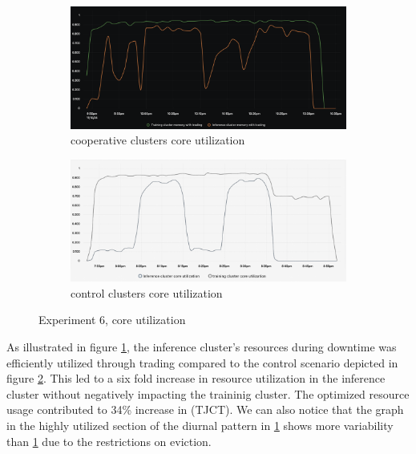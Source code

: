 \begin{figure}[H]
\centering
\begin{subfigure}{.5\textwidth}
  \centering
  \includegraphics[width=.9\linewidth]{./figures/experiment-six/trading.png}
  \caption{cooperative clusters core utilization}
  \label{fig:exp6coop}
\end{subfigure}%
\begin{subfigure}{.5\textwidth}
  \centering
  \includegraphics[width=.9\linewidth]{./figures/experiment-six/control.png}
  \caption{control clusters core utilization}
  \label{fig:exp6control}
\end{subfigure}
\caption{Experiment 6, core utilization}
\label{fig:exp6coreutil}
\end{figure}

As illustrated in figure \ref{fig:exp6coop}, the inference cluster's resources
during downtime was efficiently utilized through trading compared to the
control scenario depicted in figure \ref{fig:exp6control}. This led to a six
fold increase in resource utilization in the inference cluster without
negatively impacting the traininig cluster. The optimized resource usage
contributed to 34\% increase in (TJCT). We can also notice that the graph in
the highly utilized section of the diurnal pattern in \ref{fig:exp6coop} shows
more variability than \ref{fig:exp6coop} due to the restrictions on eviction.

